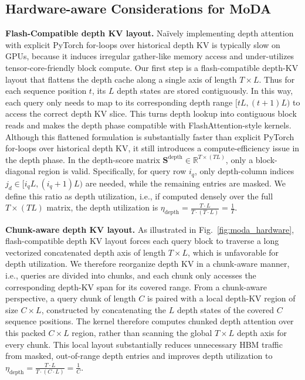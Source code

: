 \documentclass[]{bytedance_seed}
\newcommand{\myPara}[1]{\vspace{.05in}\noindent\textbf{#1.}}
\newcommand{\name}{MoDA}
\begin{document}
\subsection{Hardware-aware Considerations for \name}

\myPara{Flash-Compatible depth KV layout}
Na\"ively implementing depth attention with explicit PyTorch for-loops over historical depth KV is typically slow on GPUs,
because it induces irregular gather-like memory access and under-utilizes tensor-core-friendly block compute.
Our first step is a flash-compatible depth-KV layout that flattens the depth cache along a single axis of length $T\times L$.
Thus for each sequence position $t$, its $L$ depth states are stored contiguously.
In this way, each query only needs to map to its corresponding depth range $[tL,(t+1)L)$ to access the correct depth KV slice.
This turns depth lookup into contiguous block reads and makes the depth phase compatible with FlashAttention-style kernels.
Although this flattened formulation is substantially faster than explicit PyTorch for-loops over historical depth KV,
it still introduces a compute-efficiency issue in the depth phase.
In the depth-score matrix $\mathbf{S}^{\text{depth}}\in\mathbb{R}^{T\times (TL)}$, only a block-diagonal region is valid.
Specifically, for query row $i_q$, only depth-column indices $j_d\in[i_qL,(i_q+1)L)$ are needed, while the remaining entries are masked.
We define this ratio as depth utilization, i.e., if computed densely over the full $T\times (TL)$ matrix, 
the depth utilization is $\eta_{\text{depth}}=\frac{T\cdot L}{T\cdot (T\cdot L)}=\frac{1}{T}$.


\myPara{Chunk-aware depth KV layout}
As illustrated in Fig.~\ref{fig:moda_hardware}, 
flash-compatible depth KV layout forces each query block to traverse a long vectorized concatenated depth axis of length $T\times L$, which is unfavorable for depth utilization.
We therefore reorganize depth KV in a chunk-aware manner, i.e., queries are divided into chunks, and each chunk only accesses the corresponding depth-KV span for its covered range.
From a chunk-aware perspective, a query chunk of length $C$ is paired with a local depth-KV region of size $C\times L$, constructed by concatenating the $L$ depth states of the covered $C$ sequence positions.
The kernel therefore computes chunked depth attention over this packed $C\times L$ region, rather than scanning the global $T\times L$ depth axis for every chunk.
This local layout substantially reduces unnecessary HBM traffic from masked, out-of-range depth entries and improves depth utilization to $\eta_{\text{depth}}=\frac{T\cdot L}{T\cdot (C\cdot L)}=\frac{1}{C}$.
\end{document}
